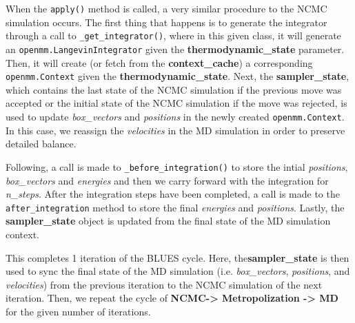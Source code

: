 When the \texttt{apply()} method is called, a very similar procedure to the NCMC simulation occurs. 
The first thing that happens is to generate the integrator through a call to \texttt{_get_integrator()}, where in this given class, it will generate an \texttt{openmm.LangevinIntegrator} given the \textbf{thermodynamic\_state} parameter.
Then, it will create (or fetch from the \textbf{context\_cache}) a corresponding \texttt{openmm.Context} given the \textbf{thermodynamic\_state}.
Next, the \textbf{sampler\_state}, which contains the last state of the NCMC simulation if the previous move was accepted or the initial state of the NCMC simulation if the move was rejected, is used to update \emph{box\_vectors} and \emph{positions} in the newly created \texttt{openmm.Context}. 
In this case, we reassign the \emph{velocities} in the MD simulation in order to preserve detailed balance.

Following, a call is made to \texttt{_before_integration()} to store the intial \emph{positions}, \emph{box\_vectors} and \emph{energies} and then we carry forward with the integration for \emph{n\_steps}.
After the integration steps have been completed, a call is made to the \texttt{after_integration} method to store the final \emph{energies} and \emph{positions}.
Lastly, the \textbf{sampler\_state} object is updated from the final state of the MD simulation context.

This completes 1 iteration of the BLUES cycle. 
Here, the\textbf{sampler\_state} is then used to sync the final state of the MD simulation (i.e. \emph{box\_vectors}, \emph{positions}, and \emph{velocities}) from the previous iteration to the NCMC simulation of the next iteration. 
Then, we repeat the cycle of \textbf{NCMC-\textgreater{} Metropolization -\textgreater{} MD} for the given number of iterations.